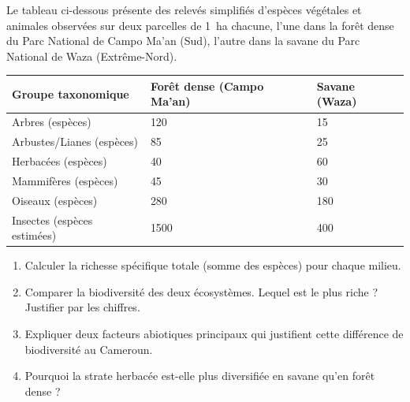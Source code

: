 \documentclass[11pt]{article}
\newcounter{popsec}
\newcounter{popsub}
\newcommand{\courssub}[1]{%
  \stepcounter{popsub}%
  \par\vspace{9pt}\noindent{\popxbold\fontsize{11.5}{13}\selectfont\color{popink}{\color{poporange}\thepopsec.\thepopsub}\hspace{6pt}#1}\par\nopagebreak\vspace{4pt}
}
\begin{document}
\courssub{Je m'entraîne}

\begin{exercice}
Le tableau ci-dessous présente des relevés simplifiés d'espèces végétales et animales observées sur deux parcelles de \SI{1}{\hectare} chacune, l'une dans la forêt dense du Parc National de Campo Ma'an (Sud), l'autre dans la savane du Parc National de Waza (Extrême-Nord).

\begin{center}
\begin{tabularx}{\linewidth}{|l|X|X|}\hline
\rowcolor{popblueL}
\textbf{Groupe taxonomique} & \textbf{Forêt dense (Campo Ma'an)} & \textbf{Savane (Waza)} \\ \hline
Arbres (espèces) & 120 & 15 \\
Arbustes/Lianes (espèces) & 85 & 25 \\
Herbacées (espèces) & 40 & 60 \\
Mammifères (espèces) & 45 & 30 \\
Oiseaux (espèces) & 280 & 180 \\
Insectes (espèces estimées) & 1500 & 400 \\ \hline
\end{tabularx}
\end{center}

\begin{enumerate}
    \item Calculer la richesse spécifique totale (somme des espèces) pour chaque milieu.
    \item Comparer la biodiversité des deux écosystèmes. Lequel est le plus riche ? Justifier par les chiffres.
    \item Expliquer deux facteurs abiotiques principaux qui justifient cette différence de biodiversité au Cameroun.
    \item Pourquoi la strate herbacée est-elle plus diversifiée en savane qu'en forêt dense ?
\end{enumerate}
\end{exercice}
\end{document}
